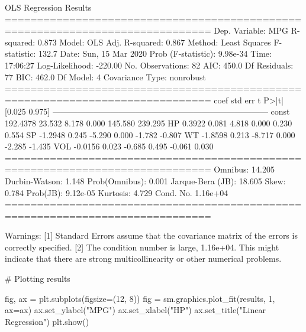 \begin{console}
                            OLS Regression Results
==============================================================================
Dep. Variable:                    MPG   R-squared:                       0.873
Model:                            OLS   Adj. R-squared:                  0.867
Method:                 Least Squares   F-statistic:                     132.7
Date:                Sun, 15 Mar 2020   Prob (F-statistic):           9.98e-34
Time:                        17:06:27   Log-Likelihood:                -220.00
No. Observations:                  82   AIC:                             450.0
Df Residuals:                      77   BIC:                             462.0
Df Model:                           4
Covariance Type:            nonrobust
==============================================================================
                 coef    std err          t      P>|t|      [0.025      0.975]
------------------------------------------------------------------------------
const        192.4378     23.532      8.178      0.000     145.580     239.295
HP             0.3922      0.081      4.818      0.000       0.230       0.554
SP            -1.2948      0.245     -5.290      0.000      -1.782      -0.807
WT            -1.8598      0.213     -8.717      0.000      -2.285      -1.435
VOL           -0.0156      0.023     -0.685      0.495      -0.061       0.030
==============================================================================
Omnibus:                       14.205   Durbin-Watson:                   1.148
Prob(Omnibus):                  0.001   Jarque-Bera (JB):               18.605
Skew:                           0.784   Prob(JB):                     9.12e-05
Kurtosis:                       4.729   Cond. No.                     1.16e+04
==============================================================================

Warnings:
[1] Standard Errors assume that the covariance matrix of the errors is correctly
specified.
[2] The condition number is large, 1.16e+04. This might indicate that there are
strong multicollinearity or other numerical problems.
\end{console}

\begin{python}
# Plotting results

fig, ax = plt.subplots(figsize=(12, 8))
fig = sm.graphics.plot_fit(results, 1, ax=ax)
ax.set_ylabel("MPG")
ax.set_xlabel("HP")
ax.set_title("Linear Regression")
plt.show()
\end{python}

